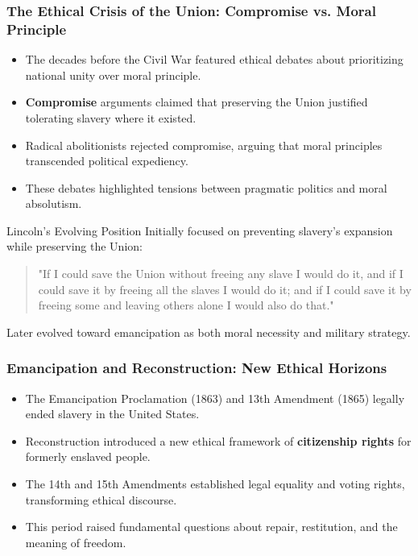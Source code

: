 \documentclass{beamer}
\begin{document}
	\begin{frame}
		\frametitle{The Ethical Crisis of the Union: Compromise vs. Moral Principle}
		
		\begin{itemize}
			\item The decades before the Civil War featured ethical debates about prioritizing national unity over moral principle.
			\item \textbf{Compromise} arguments claimed that preserving the Union justified tolerating slavery where it existed.
			\item Radical abolitionists rejected compromise, arguing that moral principles transcended political expediency.
			\item These debates highlighted tensions between pragmatic politics and moral absolutism.
		\end{itemize}
		
		\begin{block}{Lincoln's Evolving Position}
			Initially focused on preventing slavery's expansion while preserving the Union:
			\begin{quote}
				"If I could save the Union without freeing any slave I would do it, and if I could save it by freeing all the slaves I would do it; and if I could save it by freeing some and leaving others alone I would also do that."
			\end{quote}
			Later evolved toward emancipation as both moral necessity and military strategy.
		\end{block}
		
	\end{frame}
	
	\begin{frame}
		\frametitle{Emancipation and Reconstruction: New Ethical Horizons}
		
		\begin{itemize}
			\item The Emancipation Proclamation (1863) and 13th Amendment (1865) legally ended slavery in the United States.
			\item Reconstruction introduced a new ethical framework of \textbf{citizenship rights} for formerly enslaved people.
			\item The 14th and 15th Amendments established legal equality and voting rights, transforming ethical discourse.
			\item This period raised fundamental questions about repair, restitution, and the meaning of freedom.
		\end{itemize}
		
	\end{frame}
	
\end{document}

